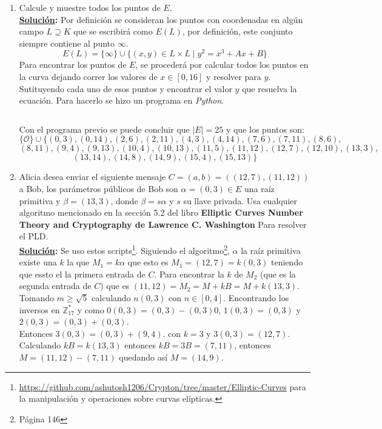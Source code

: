 \documentclass[11pt,letterpaper]{article}
\newcommand{\Z}{\mathbb{Z}}
\newcommand{\Oh}{\mathcal{O}} %
\newcommand{\sol}{\textbf{\underline{Solución}: }} %
\begin{document}
\begin{enumerate}[label=(\roman*)]
    \item Calcule y muestre todos los puntos de $E$.\\
    \sol Por definición se consideran los puntos con coordenadas en algún campo $L \supseteq K$ que se
    escribirá como $E(L)$, por definición, este conjunto siempre contiene al punto $\infty$.
    $$E(L) = \{\infty\} \cup \{(x,y) \in L \times L \mid y^2 = x^3 + Ax + B\}$$
    Para encontrar los puntos de $E$, se procederá por calcular todos los puntos en la curva
    dejando correr los valores de $x \in [0,16]$ y resolver para $y$. Sutituyendo cada uno de esos
    puntos y encontrar el valor $y$ que resuelva la ecuación. Para hacerlo se hizo
    un programa en \textit{Python}.
    
    \inputminted{python}{assets/encontrar_puntos.py}
    
    Con el programa previo se puede concluir que $|E| = 25$ y que los puntos son:
    $$\{ \Oh \} \cup \{(0, 3), (0, 14), (2, 6), (2, 11), (4, 3), (4, 14), (7, 6), (7, 11), (8, 6),$$
    $$(8, 11), (9, 4), (9, 13), (10, 4), (10, 13), (11, 5), (11, 12), (12, 7), (12, 10), (13, 3),$$
    $$(13, 14), (14, 8), (14, 9), (15, 4), (15, 13)\}$$

    \item Alicia desea enviar el siguiente mensaje $C = (a, b) = ((12, 7), (11, 12))$ a Bob,
    los parámetros públicos de Bob son $\alpha = (0, 3) \in E$ una raíz primitiva y 
    $\beta = (13, 3)$, donde $\beta = s \alpha$ y $s$ su llave privada. Usa cualquier algoritmo
    mencionado en la sección 5.2 del libro \textbf{Elliptic Curves Number Theory and Cryptography de Lawrence C. Washington}
    Para resolver el PLD.\\
    \sol Se uso estos scripts\footnote{\url{https://github.com/ashutosh1206/Crypton/tree/master/Elliptic-Curves} 
    para la manipulación y operaciones sobre curvas elípticas.}. Siguiendo el
    algoritmo\footnote{Página 146}, $\alpha$ la raíz primitiva existe
    una $k$ la que $M_1 = k\alpha$ que esto es $M_1 = (12,7) = k(0,3)$ teniendo que essto el la primera entrada
    de $C$. Para encontrar la $k$ de $M_2$ (que es la segunda entrada de $C$) que es
    $(11,12) = M_2 = M + kB = M + k(13,3)$.\\
    Tomando $m \geq \sqrt{5}$ calculando $n(0,3)$ con $n \in [0, 4]$. Encontrando los inversos en 
    $\Z_{17}^{*}$ y como $0(0,3) = (0,3) - (0,3) 0$, $1(0,3) = (0,3)$ y $2(0,3) = (0,3) + (0,3)$.\\
    Entonces $3(0,3) = (0,3) + (9,4)$. con $k = 3$ y $3(0,3) = (12,7)$.\\
    Calculando $kB = k(13,3)$ entonces $kB = 3B = (7,11)$, entonces $M=(11,12)-(7,11)$ quedando así
    $M=(14,9)$.
    

\end{enumerate}
\end{document}
